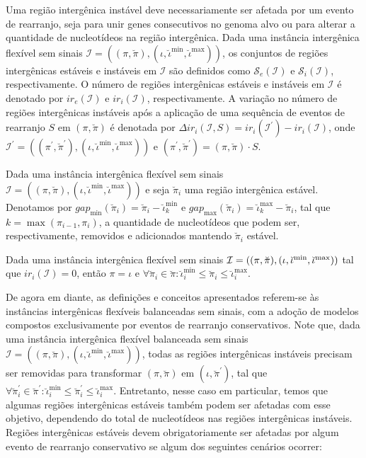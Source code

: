 Uma região intergênica instável deve necessariamente ser afetada por um evento de rearranjo, seja para unir genes consecutivos no genoma alvo ou para alterar a quantidade de nucleotídeos na região intergênica. Dada uma instância intergênica flexível sem sinais $\mathcal{I} = ((\pi,\breve\pi),(\iota,\breve\iota^{\min},\breve\iota^{\max}))$, os conjuntos de regiões intergênicas estáveis e instáveis em $\mathcal{I}$ são definidos como $\mathcal{S}_e(\mathcal{I})$ e $\mathcal{S}_i(\mathcal{I})$, respectivamente. O número de regiões intergênicas estáveis e instáveis em $\mathcal{I}$ é denotado por $ir_e(\mathcal{I})$ e $ir_i(\mathcal{I})$, respectivamente. A variação no número de regiões intergênicas instáveis após a aplicação de uma sequência de eventos de rearranjo $S$ em $(\pi,\breve\pi)$ é denotada por  $\Delta ir_i(\mathcal{I},S) = ir_i(\mathcal{I}^{\prime}) - ir_i(\mathcal{I})$, onde $\mathcal{I}^{\prime} = ((\pi^{\prime}, \breve\pi^{\prime}),(\iota,\breve\iota^{\min},\breve\iota^{\max}))$ e $(\pi^{\prime}, \breve\pi^{\prime}) = (\pi, \breve\pi) \cdot S$.

Dada uma instância intergênica flexível sem sinais $\mathcal{I} = ((\pi,\breve\pi),(\iota,\breve\iota^{\min},\breve\iota^{\max}))$ e seja $\breve\pi_i$ uma região intergênica estável. Denotamos por $gap_{\min}(\breve\pi_i) = \breve\pi_i - \breve\iota^{\min}_k$ e $gap_{\max}(\breve\pi_i) = \breve\iota^{\max}_k - \breve\pi_i$, tal que $k = \max(\pi_{i-1}, \pi_i)$, a quantidade de nucleotídeos que podem ser, respectivamente, removidos e adicionados mantendo $\breve\pi_i$ estável.

\begin{remark}\label{remark:EUSNDMWS}
Dada uma instância intergênica flexível sem sinais $\mathcal{I} = ((\pi,\breve\pi),\break(\iota,\breve\iota^{\min},\breve\iota^{\max}))$ tal que $ir_i(\mathcal{I}) = 0$, então $\pi = \iota$ e $\forall \breve\pi_i \in \breve\pi: \breve\iota^{\min}_i \le \breve\pi_i \le \breve\iota^{\max}_i$.
\end{remark}

De agora em diante, as definições e conceitos apresentados referem-se às instâncias intergênicas flexíveis balanceadas sem sinais, com a adoção de modelos compostos exclusivamente por eventos de rearranjo conservativos. Note que, dada uma instância intergênica flexível balanceada sem sinais $\mathcal{I} = ((\pi,\breve\pi),(\iota,\breve\iota^{\min},\breve\iota^{\max}))$, todas as regiões intergênicas instáveis precisam ser removidas para transformar $(\pi,\breve\pi)$ em $(\iota,\breve\pi^{\prime})$, tal que $\forall \breve\pi^{\prime}_i \in \breve\pi^{\prime} : \breve\iota^{\min}_i \le \breve\pi^{\prime}_i \le \breve\iota^{\max}_i$. Entretanto, nesse caso em particular, temos que algumas regiões intergênicas estáveis também podem ser afetadas com esse objetivo, dependendo do total de nucleotídeos nas regiões intergênicas instáveis. Regiões intergênicas estáveis devem obrigatoriamente ser afetadas por algum evento de rearranjo conservativo se algum dos seguintes cenários ocorrer:

